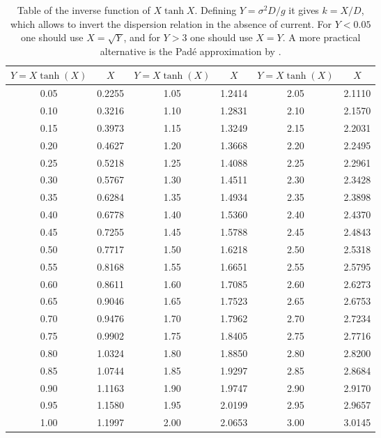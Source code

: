 \begin{table}[h]
  \centering
  \begin{tabular}{|cc  | cc | cc|}
\hline
    $Y=X\tanh(X)$ & $X$     & $Y=X\tanh(X)$ & $X$   & $Y=X\tanh(X)$ & $X$\\
 \hline
       0.05    &     0.2255   &     1.05 & 1.2414 &     2.05 & 2.1110	\\
       0.10    &     0.3216   &     1.10 & 1.2831 &     2.10 & 2.1570	\\
       0.15    &     0.3973   &     1.15 & 1.3249 &     2.15 & 2.2031	\\
       0.20    &     0.4627   &     1.20 & 1.3668 &     2.20 & 2.2495	\\
       0.25    &     0.5218   &     1.25 & 1.4088 &     2.25 & 2.2961	\\
       0.30    &     0.5767   &     1.30 & 1.4511 &     2.30 & 2.3428	\\
       0.35    &     0.6284   &     1.35 & 1.4934 &     2.35 & 2.3898	\\
       0.40    &     0.6778   &     1.40 & 1.5360 &     2.40 & 2.4370	\\
       0.45    &     0.7255   &     1.45 & 1.5788 &	2.45 & 2.4843	\\
       0.50    &     0.7717   &     1.50 & 1.6218 &	2.50 & 2.5318	\\
       0.55    &     0.8168   &     1.55 & 1.6651 &	2.55  &      2.5795   \\
       0.60    &     0.8611   &     1.60 & 1.7085 &	2.60  &      2.6273   \\
       0.65    &     0.9046   &     1.65 & 1.7523 &	2.65  &      2.6753   \\
       0.70    &     0.9476   &     1.70 & 1.7962 &	2.70  &      2.7234   \\
       0.75    &     0.9902   &     1.75 & 1.8405 &	2.75  &      2.7716   \\
       0.80    &     1.0324   &     1.80 & 1.8850 &	2.80  &      2.8200   \\
       0.85    &     1.0744   &     1.85 & 1.9297 &	2.85  &      2.8684   \\
       0.90    &     1.1163   &     1.90 & 1.9747 &	2.90  &      2.9170   \\
       0.95    &     1.1580   &     1.95 & 2.0199 &	2.95  &      2.9657   \\
       1.00    &     1.1997   &     2.00 & 2.0653 &	3.00  &      3.0145   \\
\hline
\end{tabular}
  \caption{Table of the inverse function of $X \tanh X$. Defining $Y=\sigma^2 D/g$ it gives $k=X/D$, 
which allows to invert the dispersion relation in the absence of current. 
For $Y< 0.05$ one should use $X=\sqrt{Y}$, and for $Y >3$ one should use $X=Y$. A more practical alternative is the Pad{\'e} approximation by \cite{Wu&Thornton1986}.}\label{table_dispersion}
\end{table}


